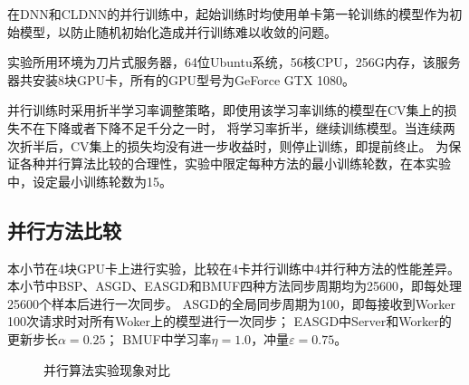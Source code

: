 在DNN和CLDNN的并行训练中，起始训练时均使用单卡第一轮训练的模型作为初始模型，以防止随机初始化造成并行训练难以收敛的问题。

实验所用环境为刀片式服务器，64位Ubuntu系统，56核CPU，256G内存，该服务器共安装8块GPU卡，所有的GPU型号为GeForce GTX 1080。

并行训练时采用折半学习率调整策略，即使用该学习率训练的模型在CV集上的损失不在下降或者下降不足千分之一时，
将学习率折半，继续训练模型。当连续两次折半后，CV集上的损失均没有进一步收益时，则停止训练，即提前终止。
为保证各种并行算法比较的合理性，实验中限定每种方法的最小训练轮数，在本实验中，设定最小训练轮数为15。

\subsection{并行方法比较}

本小节在4块GPU卡上进行实验，比较在4卡并行训练中4并行种方法的性能差异。
本小节中BSP、ASGD、EASGD和BMUF四种方法同步周期均为25600，即每处理25600个样本后进行一次同步。
ASGD的全局同步周期为100，即每接收到Worker 100次请求时对所有Woker上的模型进行一次同步；
EASGD中Server和Worker的更新步长$\alpha=0.25$；
BMUF中学习率$\eta=1.0$，冲量$\varepsilon=0.75$。

\begin{figure}[htb]
  \centering
  \hspace{1in}
  \caption{并行算法实验现象对比}
  \label{fig:parallel-cv} %
\end{figure}

